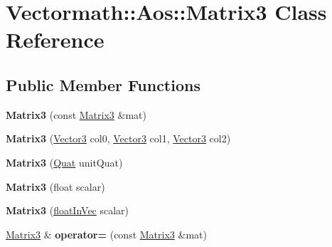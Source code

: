 \hypertarget{classVectormath_1_1Aos_1_1Matrix3}{\section{Vectormath\-:\-:Aos\-:\-:Matrix3 Class Reference}
\label{classVectormath_1_1Aos_1_1Matrix3}
}
\subsection*{Public Member Functions}
\begin{DoxyCompactItemize}
\item 
\hypertarget{classVectormath_1_1Aos_1_1Matrix3_a3e073b4d8297328a7d63fa80657752df}{{\bfseries Matrix3} (const \hyperlink{classVectormath_1_1Aos_1_1Matrix3}{Matrix3} \&mat)}\label{classVectormath_1_1Aos_1_1Matrix3_a3e073b4d8297328a7d63fa80657752df}

\item 
\hypertarget{classVectormath_1_1Aos_1_1Matrix3_a279da8a93caa0cd39f8845543898dd23}{{\bfseries Matrix3} (\hyperlink{classVectormath_1_1Aos_1_1Vector3}{Vector3} col0, \hyperlink{classVectormath_1_1Aos_1_1Vector3}{Vector3} col1, \hyperlink{classVectormath_1_1Aos_1_1Vector3}{Vector3} col2)}\label{classVectormath_1_1Aos_1_1Matrix3_a279da8a93caa0cd39f8845543898dd23}

\item 
\hypertarget{classVectormath_1_1Aos_1_1Matrix3_ae3472b21c6c5f1796aac1a3b68739190}{{\bfseries Matrix3} (\hyperlink{classVectormath_1_1Aos_1_1Quat}{Quat} unit\-Quat)}\label{classVectormath_1_1Aos_1_1Matrix3_ae3472b21c6c5f1796aac1a3b68739190}

\item 
\hypertarget{classVectormath_1_1Aos_1_1Matrix3_ab789a362d913ac070001534adb906e0c}{{\bfseries Matrix3} (float scalar)}\label{classVectormath_1_1Aos_1_1Matrix3_ab789a362d913ac070001534adb906e0c}

\item 
\hypertarget{classVectormath_1_1Aos_1_1Matrix3_ac3ed42719d9b026f3ea025cb88169695}{{\bfseries Matrix3} (\hyperlink{classVectormath_1_1floatInVec}{float\-In\-Vec} scalar)}\label{classVectormath_1_1Aos_1_1Matrix3_ac3ed42719d9b026f3ea025cb88169695}

\item 
\hypertarget{classVectormath_1_1Aos_1_1Matrix3_ac0cca76c1d4f774f76902efa0bb6bd76}{\hyperlink{classVectormath_1_1Aos_1_1Matrix3}{Matrix3} \& {\bfseries operator=} (const \hyperlink{classVectormath_1_1Aos_1_1Matrix3}{Matrix3} \&mat)}\label{classVectormath_1_1Aos_1_1Matrix3_ac0cca76c1d4f774f76902efa0bb6bd76}


\end{DoxyCompactItemize}
